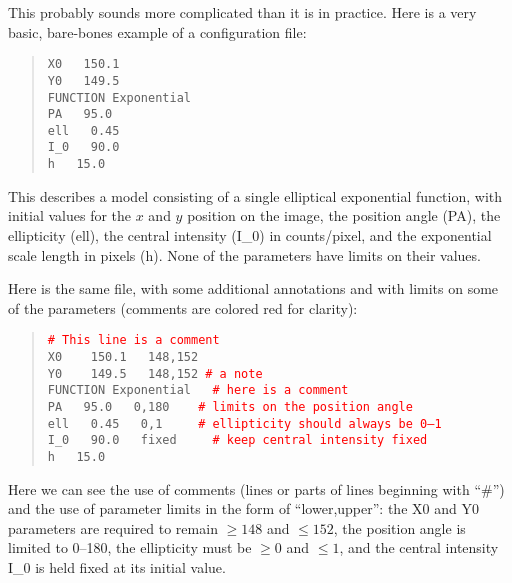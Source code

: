 \documentclass[10pt]{article}
\newcommand{\red}{\textcolor{red}}
\begin{document}
This probably sounds more complicated than it is in practice.
Here is a very basic, bare-bones example of a configuration file:

\begin{quote}
  \texttt{X0  ~  150.1}\\
  \texttt{Y0  ~  149.5}\\
  \texttt{FUNCTION   Exponential}\\
  \texttt{PA  ~  95.0}\\
  \texttt{ell  ~  0.45}\\
  \texttt{I\_0 ~  90.0}\\
  \texttt{h   ~  15.0}\\
\end{quote}

This describes a model consisting of a single elliptical exponential
function, with initial values for the $x$ and $y$ position on the image,
the position angle (PA), the ellipticity (ell), the central intensity
(I\_0) in counts/pixel, and the exponential scale length in pixels (h).
None of the parameters have limits on their values.

Here is the same file, with some additional annotations and with limits on
some of the parameters (comments are colored red for clarity):

\begin{quote}
  \texttt{\red{\# This line is a comment}}\\
  
  \texttt{X0 ~~   150.1 ~  148,152}\\
  \texttt{Y0 ~~   149.5 ~  148,152         \red{\# a note}}\\
  \texttt{FUNCTION   Exponential  ~ \red{\# here is a comment}}\\
  \texttt{PA  ~  95.0  ~ 0,180   ~~   \red{\# limits on the position angle}}\\
  \texttt{ell  ~  0.45 ~ 0,1     ~~~ \red{\# ellipticity should always be 0--1}}\\
  \texttt{I\_0 ~  90.0 ~  fixed ~~~ \red{\# keep central intensity fixed}}\\
  \texttt{h    ~ 15.0}\\
\end{quote}

Here we can see the use of comments (lines or parts of lines beginning with
``\#'') and the use of parameter limits in the form of ``lower,upper'': the X0 and Y0 parameters are
required to remain $\geq 148$ and $\leq 152$, the position angle is limited
to 0--180, the ellipticity must be $\geq 0$ and $\leq 1$, and the central
intensity I\_0 is held fixed at its initial value.
\end{document}
